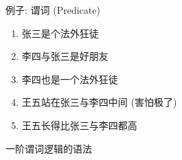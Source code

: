 
\begin{frame}{}
  \begin{exampleblock}{例子: 谓词 (Predicate)}
    \begin{enumerate}[<+->][(1)]
      \setlength{\itemsep}{6pt}
      \item 张三是个法外狂徒
      \item 李四与张三是好朋友
      \item 李四也是一个法外狂徒
      \item 王五站在张三与李四中间 (害怕极了)
      \item 王五长得比张三与李四都高
    \end{enumerate}
  \end{exampleblock}

  \vspace{0.30cm}
\end{frame}

\begin{frame}{}
  \begin{center}
    一阶谓词逻辑的语法

  \end{center}
\end{frame}

